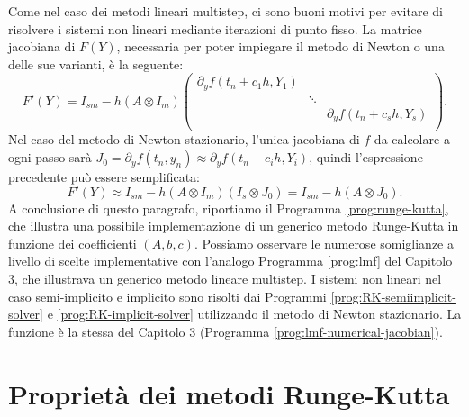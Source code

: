 Come nel caso dei metodi lineari multistep, ci sono buoni motivi per evitare
di risolvere i sistemi non lineari mediante iterazioni di punto fisso.
La matrice jacobiana di $F(Y)$, necessaria per poter impiegare
il metodo di Newton o una delle sue varianti, è la seguente:
\[
F'(Y) = I_{sm} - h (A \otimes I_m) \begin{pmatrix}
\partial_y f(t_n+c_1 h,Y_1) & & \\
& \ddots & \\
& & \partial_y f(t_n+c_s h,Y_s) \\
\end{pmatrix}.
\]
Nel caso del metodo di Newton stazionario, l'unica jacobiana di $f$ da calcolare
a ogni passo sarà $J_0 = \partial_y f(t_n,y_n) \approx \partial_y f(t_n+c_i h, Y_i)$,
quindi l'espressione precedente può essere semplificata:
\[
F'(Y) \approx I_{sm} - h (A \otimes I_m)(I_s \otimes J_0) = I_{sm} - h (A \otimes J_0).
\]
A conclusione di questo paragrafo, riportiamo il Programma \ref{prog:runge-kutta},
che illustra una possibile implementazione di un generico metodo Runge-Kutta
in funzione dei coefficienti $(A,b,c)$. Possiamo osservare le numerose
somiglianze a livello di scelte implementative con l'analogo
Programma \ref{prog:lmf} del Capitolo 3, che illustrava un generico metodo
lineare multistep. I sistemi non lineari nel caso semi-implicito e implicito
sono risolti dai Programmi \ref{prog:RK-semiimplicit-solver} e
\ref{prog:RK-implicit-solver} utilizzando il metodo di Newton stazionario.
La funzione  è la stessa del Capitolo 3
(Programma \ref{prog:lmf-numerical-jacobian}).

\clearpage







\clearpage

\section{Proprietà dei metodi Runge-Kutta}

